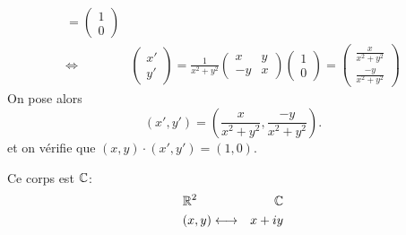 {\begin{td-sol}[]
\begin{equation*}
\begin{aligned}
                = \begin{pmatrix}
                    1\\
                    0
                \end{pmatrix}\\
                \iff & \begin{pmatrix}
                    x'\\
                    y'
                \end{pmatrix}
                = \frac{1}{x^2+y^2}\begin{pmatrix}
                    x & y\\
                    -y & x
                \end{pmatrix}
                \begin{pmatrix}
                    1\\
                    0
                \end{pmatrix}
                = \begin{pmatrix}
                    \frac{x}{x^2+y^2}\\
                    \frac{-y}{x^2+y^2}
                \end{pmatrix}
            \end{aligned}
        \end{equation*}
        On pose alors
        \begin{equation*}
            (x',y') = \left(\frac{x}{x^2+y^2},\frac{-y}{x^2+y^2}\right).
        \end{equation*}
        et on vérifie que \((x,y) \cdot (x',y') = (1,0)\).

        Ce corps est \(\mathbb{C}\):
        \begin{equation*}
            \begin{aligned}
                &\mathbb{R}^2&\mathbb{C}\\
                &(x,y) \longleftrightarrow& x+iy
            \end{aligned}
        \end{equation*}
    \end{td-sol}
}{}

